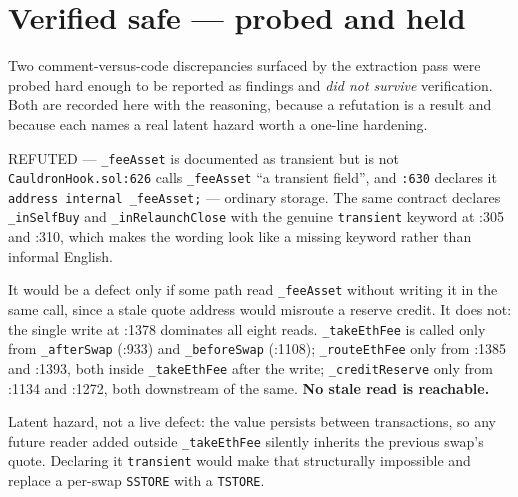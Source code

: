 \documentclass[11pt,a4paper]{article}
\newcommand{\code}[1]{\texttt{\small #1}}
\newcommand{\fileref}[1]{\texttt{\scriptsize #1}}
\begin{document}
\section{Verified safe --- probed and held}\label{sec:safe}

Two comment-versus-code discrepancies surfaced by the extraction pass were probed hard
enough to be reported as findings and \emph{did not survive} verification. Both are
recorded here with the reasoning, because a refutation is a result and because each names
a real latent hazard worth a one-line hardening.

\begin{notebox}{REFUTED --- \code{\_feeAsset} is documented as transient but is not}
\fileref{CauldronHook.sol:626} calls \code{\_feeAsset} ``a transient field'', and
\fileref{:630} declares it \code{address internal \_feeAsset;} --- ordinary storage. The
same contract declares \code{\_inSelfBuy} and \code{\_inRelaunchClose} with the genuine
\code{transient} keyword at :305 and :310, which makes the wording look like a missing
keyword rather than informal English.

It would be a defect only if some path read \code{\_feeAsset} without writing it in the
same call, since a stale quote address would misroute a reserve credit. It does not: the
single write at :1378 dominates all eight reads. \code{\_takeEthFee} is called only from
\code{\_afterSwap} (:933) and \code{\_beforeSwap} (:1108); \code{\_routeEthFee} only from
:1385 and :1393, both inside \code{\_takeEthFee} after the write; \code{\_creditReserve}
only from :1134 and :1272, both downstream of the same. \textbf{No stale read is
reachable.}

Latent hazard, not a live defect: the value persists between transactions, so any future
reader added outside \code{\_takeEthFee} silently inherits the previous swap's quote.
Declaring it \code{transient} would make that structurally impossible and replace a
per-swap \code{SSTORE} with a \code{TSTORE}.
\end{notebox}
\end{document}
